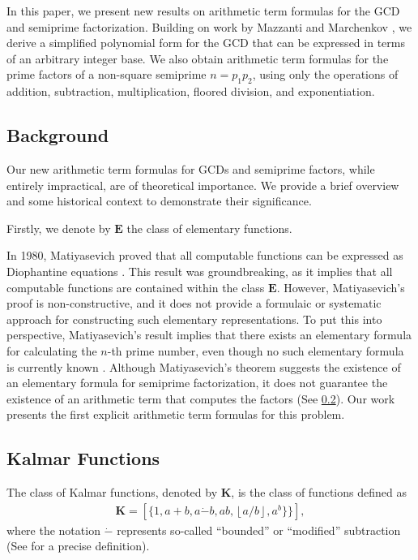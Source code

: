 \documentclass[11pt,reqno]{article}
\theoremstyle{plain}
\theoremstyle{definition}
\newcommand{\floor}[1]{\left\lfloor #1 \right\rfloor}
\begin{document}
In this paper, we present new results on arithmetic term formulas for the GCD and semiprime factorization. Building on work by Mazzanti and Marchenkov \cite{mazzanti2002plainbases, marchenkov1980superposition}, we derive a simplified polynomial form for the GCD that can be expressed in terms of an arbitrary integer base. We also obtain arithmetic term formulas for the prime factors of a non-square semiprime $n=p_1 p_2$, using only the operations of addition, subtraction, multiplication, floored division, and exponentiation.

\subsection{Background}
Our new arithmetic term formulas for GCDs and semiprime factors, while entirely impractical, are of theoretical importance. We provide a brief overview and some historical context to demonstrate their significance.

Firstly, we denote by $\textbf{E}$ the class of elementary functions.

In 1980, Matiyasevich proved that all computable functions can be expressed as Diophantine equations \cite{matiyasevich1980diophantine, matiyasevich1993hilbert}. This result was groundbreaking, as it implies that all computable functions are contained within the class $\textbf{E}$. However, Matiyasevich's proof is non-constructive, and it does not provide a formulaic or systematic approach for constructing such elementary representations. To put this into perspective, Matiyasevich's result implies that there exists an elementary formula for calculating the $n$-th prime number, even though no such elementary formula is currently known \cite{prunescu2024factorial}. Although Matiyasevich's theorem suggests the existence of an elementary formula for semiprime factorization, it does not guarantee the existence of an arithmetic term that computes the factors (See \cref{subsection:kalmar}). Our work presents the first explicit arithmetic term formulas for this problem.

\subsection{Kalmar Functions} \label{subsection:kalmar}
 The class of Kalmar functions, denoted by $\textbf{K}$, is the class of functions defined as
\begin{align*}
    \textbf{K} = [\{ 1, a+b, a\Dot{-}b, ab, \floor{a/b}, a^b \} \}],
\end{align*}
where the notation $\Dot{-}$ represents so-called ``bounded'' or ``modified'' subtraction (See \cite{mazzanti2002plainbases} for a precise definition).
\end{document}
